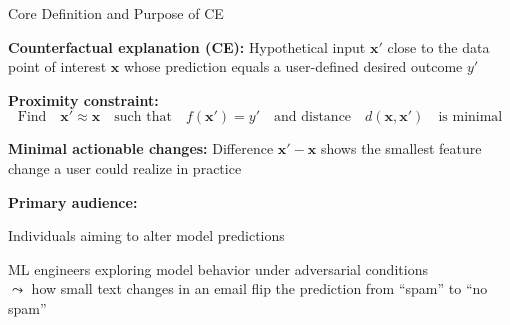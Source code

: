 \documentclass[10pt,compress,t,notes=noshow, xcolor=table]{beamer}
\begin{document}


\begin{framev}[align=top]{Core Definition and Purpose of CE}
\begin{itemizeM}
\item<1-> \textbf{Counterfactual explanation (CE):} Hypothetical input $\mathbf{x}'$ close to the data point of interest $\mathbf{x}$ whose prediction equals a user-defined desired outcome $y'$
\item<2-> \textbf{Proximity constraint:} %
$$
\text{Find} \quad \mathbf{x}' \approx \mathbf{x} \quad \text{such that} \quad f(\mathbf{x}') = y' \quad \text{and distance} \quad d(\mathbf{x},\mathbf{x}') \quad \text{is minimal}
$$
\item<3-> \textbf{Minimal actionable changes:} Difference $\mathbf{x}' - \mathbf{x}$ shows the smallest feature change a user could realize in practice
\item<4-> \textbf{Primary audience:}
\begin{itemizeS}
\item Individuals aiming to alter model predictions
\item ML engineers exploring model behavior under adversarial conditions\\
$\leadsto$ how small text changes in an email flip the prediction from ``spam'' to ``no spam''
\end{itemizeS}
\end{itemizeM}
\end{framev}
\end{document}
